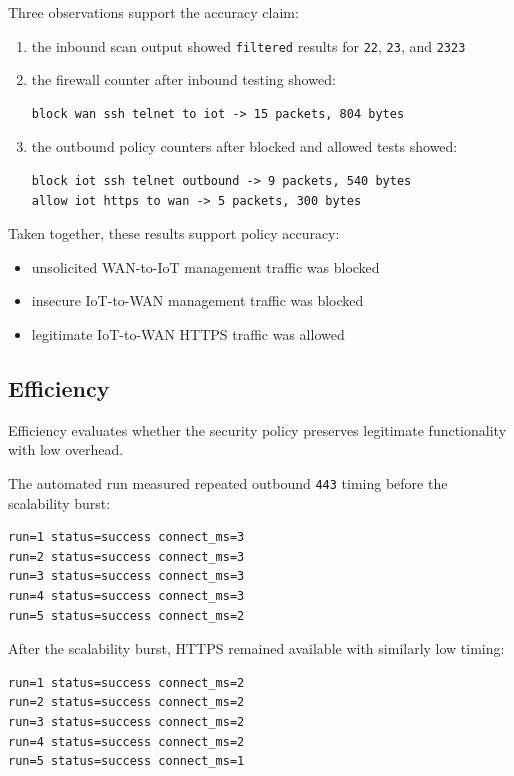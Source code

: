 \documentclass[journal]{IEEEtran}
\begin{document}
Three observations support the accuracy claim:
\begin{enumerate}
\item the inbound scan output showed \texttt{filtered} results for \texttt{22}, \texttt{23}, and \texttt{2323}
\item the firewall counter after inbound testing showed:
\begin{lstlisting}
block wan ssh telnet to iot -> 15 packets, 804 bytes
\end{lstlisting}
\item the outbound policy counters after blocked and allowed tests showed:
\begin{lstlisting}
block iot ssh telnet outbound -> 9 packets, 540 bytes
allow iot https to wan -> 5 packets, 300 bytes
\end{lstlisting}
\end{enumerate}

Taken together, these results support policy accuracy:
\begin{itemize}
\item unsolicited WAN-to-IoT management traffic was blocked
\item insecure IoT-to-WAN management traffic was blocked
\item legitimate IoT-to-WAN HTTPS traffic was allowed
\end{itemize}

\subsection{Efficiency}
Efficiency evaluates whether the security policy preserves legitimate functionality with low overhead.

The automated run measured repeated outbound \texttt{443} timing before the scalability burst:

\begin{lstlisting}
run=1 status=success connect_ms=3
run=2 status=success connect_ms=3
run=3 status=success connect_ms=3
run=4 status=success connect_ms=3
run=5 status=success connect_ms=2
\end{lstlisting}

After the scalability burst, HTTPS remained available with similarly low timing:

\begin{lstlisting}
run=1 status=success connect_ms=2
run=2 status=success connect_ms=2
run=3 status=success connect_ms=2
run=4 status=success connect_ms=2
run=5 status=success connect_ms=1
\end{lstlisting}
\end{document}
